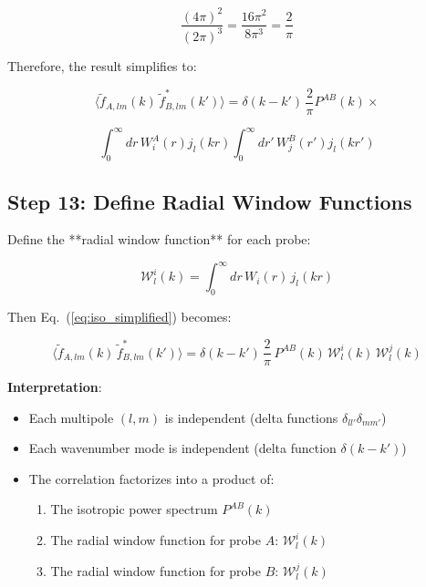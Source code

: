 \begin{equation}
    \frac{(4\pi)^2}{(2\pi)^3} = \frac{16\pi^2}{8\pi^3} = \frac{2}{\pi}
\label{eq:phase_simplification}
\end{equation}

Therefore, the result simplifies to:

\begin{equation}
    \langle \tilde{f}_{A,lm}(k) \, \tilde{f}_{B,lm}^*(k') \rangle = \delta(k - k') \, \frac{2}{\pi} P^{AB}(k) \times
\label{eq:iso_simplified}
\end{equation}

\begin{equation}
    \int_0^{\infty} dr \, W_i^A(r) j_{l}(kr) \int_0^{\infty} dr' \, W_j^B(r') j_{l}(kr')
\end{equation}

\subsection{Step 13: Define Radial Window Functions}

Define the **radial window function** for each probe:

\begin{equation}
    \mathcal{W}_l^i(k) = \int_0^{\infty} dr \, W_i(r) \, j_l(kr)
\label{eq:window_func_def}
\end{equation}

Then Eq.~(\ref{eq:iso_simplified}) becomes:

\begin{equation}
    \langle \tilde{f}_{A,lm}(k) \, \tilde{f}_{B,lm}^*(k') \rangle = \delta(k - k') \, \frac{2}{\pi} \, P^{AB}(k) \, \mathcal{W}_l^i(k) \, \mathcal{W}_l^j(k)
\label{eq:iso_window}
\end{equation}

\textbf{Interpretation}:
\begin{itemize}
    \item Each multipole $(l,m)$ is independent (delta functions $\delta_{ll'} \delta_{mm'}$)
    \item Each wavenumber mode is independent (delta function $\delta(k - k')$)
    \item The correlation factorizes into a product of:
    \begin{enumerate}
        \item The isotropic power spectrum $P^{AB}(k)$
        \item The radial window function for probe $A$: $\mathcal{W}_l^i(k)$
        \item The radial window function for probe $B$: $\mathcal{W}_l^j(k)$
    \end{enumerate}
\end{itemize}

